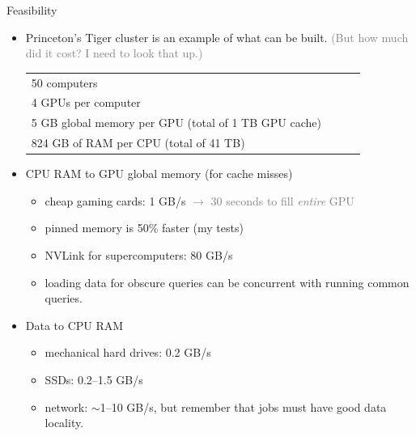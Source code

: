 \documentclass{beamer}
\begin{document}
\begin{frame}{Feasibility}
\vspace{0.25 cm}
\begin{itemize}
\item Princeton's Tiger cluster is an example of what can be built. \textcolor{gray}{\small (But how much did it cost? I need to look that up.)}

\small
\hfill \begin{tabular}{p{0.9\linewidth}}
50 computers \\
4 GPUs per computer \\
5 GB global memory per GPU (total of 1 TB GPU cache) \\
824 GB of RAM per CPU (total of 41 TB)
\end{tabular}

\normalsize
\item<2-> CPU RAM to GPU global memory (for cache misses)
\begin{itemize}
\item cheap gaming cards: 1 GB/s \textcolor{gray}{$\to$ 30 seconds to fill {\it entire} GPU}
\item pinned memory is 50\% faster (my tests)
\item NVLink for supercomputers: 80 GB/s
\item loading data for obscure queries can be concurrent with running common queries.
\end{itemize}

\item<3-> Data to CPU RAM
\begin{itemize}
\item mechanical hard drives: 0.2 GB/s
\item SSDs: 0.2--1.5 GB/s
\item network: $\sim$1--10 GB/s, but remember that jobs must have good data locality.
\end{itemize}

\end{itemize}
\end{frame}
\end{document}
